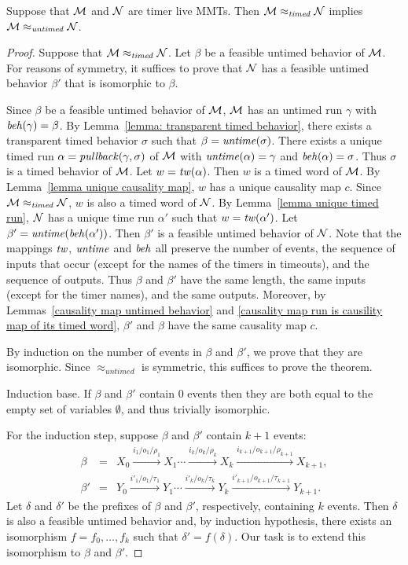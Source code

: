 \begin{theorem}
\label{timedimpliesuntimed}
Suppose that ${\mathcal M}$ and ${\mathcal N}$ are timer live MMTs. Then
${\mathcal M} \approx_{\mathit{timed}} {\mathcal N}$
implies
${\mathcal M} \approx_{\mathit{untimed}} {\mathcal N}$.
\end{theorem}
\iflong
\begin{proof}
Suppose that ${\mathcal M} \approx_{\mathit{timed}} {\mathcal N}$.
Let $\beta$ be a feasible untimed behavior of ${\mathcal M}$.
For reasons of symmetry, it suffices to prove that ${\mathcal N}$ has a feasible untimed behavior $\beta'$ that is isomorphic to $\beta$.

Since $\beta$ be a feasible untimed behavior of ${\mathcal M}$, ${\mathcal M}$ has an untimed run $\gamma$ with $\mathit{beh}(\gamma) = \beta$.
By Lemma~\ref{lemma: transparent timed behavior}, there exists a 
transparent timed behavior $\sigma$ such that $\beta = \mathit{untime}(\sigma)$.
There exists a unique timed run $\alpha = \mathit{pullback}(\gamma,\sigma)$ of ${\mathcal M}$ with $\mathit{untime}(\alpha) = \gamma$ and $\mathit{beh}(\alpha) = \sigma$.
Thus $\sigma$ is a timed behavior of ${\mathcal M}$.
Let  $w = \mathit{tw}(\alpha)$.
Then $w$ is a timed word of ${\mathcal M}$.
By Lemma~\ref{lemma unique causality map}, $w$ has a unique causality map $c$.
Since ${\mathcal M} \approx_{\mathit{timed}} {\mathcal N}$, $w$ is also a timed word of ${\mathcal N}$.
By Lemma~\ref{lemma unique timed run}, ${\mathcal N}$ has a unique time run $\alpha'$ such that $w = \mathit{tw}(\alpha')$.
Let $\beta' = \mathit{untime}(\mathit{beh}(\alpha'))$.
Then $\beta'$ is a feasible untimed behavior of ${\mathcal N}$.
Note that the mappings $\mathit{tw}$, $\mathit{untime}$ and $\mathit{beh}$ all preserve the number of events, the sequence of inputs that occur (except for the names of the timers in timeouts), and the sequence of outputs. Thus $\beta$ and $\beta'$ have the same length, the same inputs (except for the timer names), and the same outputs.
Moreover, by Lemmas~\ref{causality map untimed behavior} and \ref{causality map run is causility map of its timed word},
$\beta'$ and $\beta$ have the same causality map $c$.

By induction on the number of events in $\beta$ and $\beta'$, we prove that they are isomorphic.
Since $\approx_{\mathit{untimed}}$ is symmetric, this suffices to prove the theorem.

Induction base. If $\beta$ and $\beta'$ contain $0$ events then they are both equal to the empty set of variables $\emptyset$,
and thus trivially isomorphic.

For the induction step, suppose $\beta$ and $\beta'$ contain $k+1$ events:
\begin{eqnarray*}
\beta & = & X_0 \xrightarrow{i_1/o_1/\rho_1} X_1 \cdots \xrightarrow{i_k/o_k/\rho_k} X_{k}
 \xrightarrow{i_{k+1}/o_{k+1}/\rho_{k+1}} X_{k+1},\\
\beta' & = & Y_0 \xrightarrow{i'_1/o_1/\tau_1} Y_1  \cdots \xrightarrow{i'_k/o_k/\tau_k} Y_{k} 
 \xrightarrow{i'_{k+1}/o_{k+1}/\tau_{k+1}} Y_{k+1}.
\end{eqnarray*}
Let $\delta$ and $\delta'$ be the prefixes of $\beta$ and $\beta'$, respectively,
containing $k$ events. Then $\delta$ is also a feasible untimed behavior and, by
induction hypothesis, there exists an isomorphism $f = f_0 ,\ldots, f_k$ such that $\delta' = f(\delta)$.
Our task is to extend this isomorphism to $\beta$ and $\beta'$.


\end{proof}
